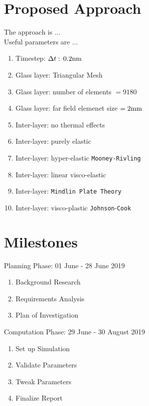 \documentclass[format=acmtog, 12pt, screen=true, review=false]{acmart}
\begin{document}
\section{Proposed Approach}

The approach is ... \\

Useful parameters are ...
\begin{enumerate}
    \item Timestep: $\Delta t:\,0.2\rm{nm}$ \cite{Che18}
    \item Glass layer: Triangular Mesh \cite{Che18}
    \item Glass layer: number of elements $=9180$ \cite{Che18}
    \item Glass layer: far field elemenet size $=2\rm{mm}$ \cite{Che18}
    \item Inter-layer: no thermal effects \cite{Che18}
    \item Inter-layer: purely elastic \cite{Che18, Ji98}
    \item Inter-layer: hyper-elastic \texttt{Mooney-Rivling} \cite{Che16}
    \item Inter-layer: linear visco-elastic \cite{Flo98}
    \item Inter-layer: \texttt{Mindlin Plate Theory} \cite{Yua17, ElS18}
    \item Inter-layer: visco-plastic \texttt{Johnson}-\texttt{Cook} \cite{Xu11, Gao14}
\end{enumerate}

\section{Milestones}

Planning Phase: 01 June - 28 June 2019
\begin{enumerate}
    \item Background Research
    \item Requirements Analysis
    \item Plan of Investigation
\end{enumerate}

Computation Phase: 29 June - 30 August 2019
\begin{enumerate}[resume]
    \item Set up Simulation
    \item Validate Parameters
    \item Tweak Parameters
    \item Finalize Report
\end{enumerate}
\end{document}
